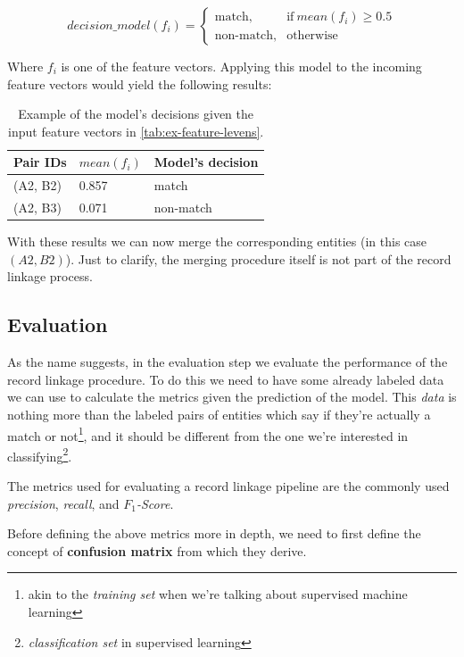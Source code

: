 \documentclass[epsfig,a4paper,11pt,titlepage,twoside,openany]{book}
\begin{document}
\begin{equation*}
  decision\_model(f_i) =
  \begin{cases}
    \text{match}, & \text{if}\ mean(f_i) \geq 0.5  \\
    \text{non-match}, & \text{otherwise}
  \end{cases}
\end{equation*}

Where $f_i$ is one of the feature vectors. Applying this model to the incoming
feature vectors would yield the following results:

\begin{table}[H]
  \centering
  \begin{tabular}{l|l|l}
    Pair IDs & $mean(f_i)$ & Model's decision \\ \hline
    (A2, B2) & 0.857       & match            \\
    (A2, B3) & 0.071       & non-match           
  \end{tabular}
  \caption{Example of the model's decisions given the input feature vectors in
    \autoref{tab:ex-feature-levens}.}
  \label{tab:ex-linking}
\end{table}

With these results we can now merge the corresponding entities (in this case
$(A2, B2)$). Just to clarify, the merging procedure itself is not part of the
record linkage process.

\subsection{Evaluation}
\label{sec:rl-workflow-evaluation}

As the name suggests, in the evaluation step we evaluate the performance of the
record linkage procedure. To do this we need to have some already labeled data
we can use to calculate the metrics given the prediction of the model. This
\textit{data} is nothing more than the labeled pairs of entities which say if
they're actually a match or not\footnote{akin to the \textit{training set} when
  we're talking about supervised machine learning}, and it should be different
from the one we're interested in classifying\footnote{\textit{classification
    set} in supervised learning}.

The metrics used for evaluating a record linkage pipeline are the commonly used
\cite{Powers2011_evaluation} \textit{precision}, \textit{recall}, and
\textit{$F_1$-Score}.

Before defining the above metrics more in depth, we need to first define the
concept of \textbf{confusion matrix} from which they derive.
\end{document}
